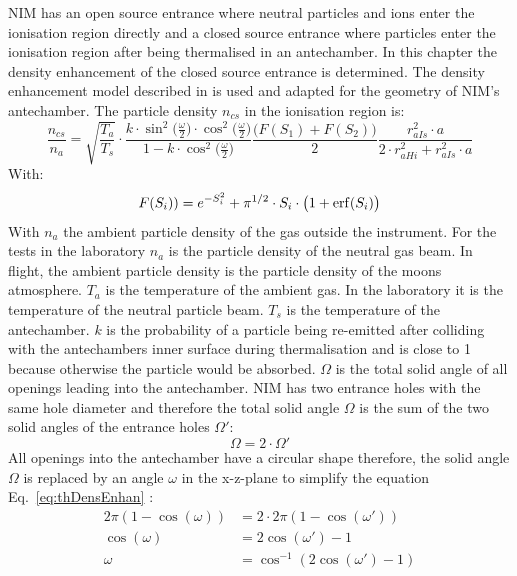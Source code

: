 	NIM has an open source entrance where neutral particles and ions enter the ionisation region directly and a closed source entrance where particles enter the ionisation region after being thermalised in an antechamber. In this chapter the density enhancement of the closed source entrance is determined. The density enhancement model described in \cite{DensEnhan_Wurz_07} is used and adapted for the geometry of NIM's antechamber. The particle density $n_{cs}$ in the ionisation region is:
	\begin{equation}
		\frac{n_{cs}}{n_a} = \sqrt{\frac{T_a}{T_s}}\cdot\frac{k\cdot \sin^2\big(\frac{\omega}{2}\big)\cdot \cos^2\big(\frac{\omega}{2}\big)}{1-k\cdot \cos^2\big(\frac{\omega}{2}\big)}\frac{\big(F(S_1)+ F(S_2)\big)}{2} \frac{r_{aIs}^2\cdot a}{2\cdot r_{aHi}^2 + r_{aIs}^2\cdot a}
		\label{eq:thDensEnhan}
	\end{equation}
	With:
	\begin{equation}
		F(S_i)) = e^{-S_i^2} + \pi^{1/2}\cdot S_i\cdot\big(1 + {\rm erf}(S_i)\big)
		\label{eq:F(S)}
	\end{equation}
	With $n_a$ the ambient particle density of the gas outside the instrument. For the tests in the laboratory $n_a$ is the particle density of the neutral gas beam. In flight, the ambient particle density is the particle density of the moons atmosphere. $T_a$ is the temperature of the ambient gas. In the laboratory it is the temperature of the neutral particle beam. $T_s$ is the temperature of the antechamber. $k$ is the probability of a particle being re-emitted after colliding with the antechambers inner surface during thermalisation and is close to 1 because otherwise the particle would be absorbed. $\Omega$ is the total solid angle of all openings leading into the antechamber. NIM has two entrance holes with the same hole diameter and therefore the total solid angle $\Omega$ is the sum of the two solid angles of the entrance holes $\Omega'$:
	\begin{equation}
		\Omega = 2\cdot\Omega'
	\end{equation}
	All openings into the antechamber have a circular shape therefore, the solid angle $\Omega$ is replaced by an angle $\omega$ in the x-z-plane to simplify the equation Eq.~\eqref{eq:thDensEnhan} \cite{Hedin_1964}: 
	\begin{align}
		2\pi(1- \cos(\omega)) &= 2\cdot 2\pi(1- \cos(\omega'))\\
		\cos(\omega) &= 2\cos(\omega') -1\\
		\omega &= \cos^{-1}(2\cos(\omega') -1)
	\end{align}
